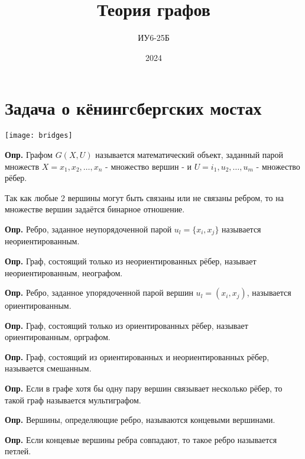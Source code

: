\documentclass[10pt]{article}
\title{Теория графов}
\author{ИУ6-25Б}
\date{2024}
\begin{document}
\maketitle


\section*{Задача о кёнингсбергских мостах}
\begin{center}
    \texttt{[image: bridges]}
\end{center}
\par\textbf{Опр.} Графом $G(X, U)$ называется математический объект, заданный парой множеств $X = {x_{1}, x_{2}, \dots, x_{n}}$ - множество вершин - и $U = {i_{1}, u_{2}, \dots, u_{m}}$ - множество рёбер.
\par Так как любые 2 вершины могут быть связаны или не связаны ребром, то на множестве вершин задаётся бинарное отношение.
\par\textbf{Опр.} Ребро, заданное неупорядоченной парой $u_{l} = \{ x_{i}, x_{j} \}$ называется неориентированным.
\par\textbf{Опр.} Граф, состоящий только из неориентированных рёбер, называет неориентированным, неографом.
\par\textbf{Опр.} Ребро, заданное упорядоченной парой вершин $u_{l} = (x_{i}, x_{j})$, называется ориентированным.
\par\textbf{Опр.} Граф, состоящий только из ориентированных рёбер, называет ориентированным, орграфом.
\par\textbf{Опр.} Граф, состоящий из ориентированных и неориентированных рёбер, называется смешанным.
\par\textbf{Опр.} Если в графе хотя бы одну пару вершин связывает несколько рёбер, то такой граф называется мультиграфом.
\par\textbf{Опр.} Вершины, определяющие ребро, называются концевыми вершинами.
\par\textbf{Опр.} Если концевые вершины ребра совпадают, то такое ребро называется петлей.
\end{document}
